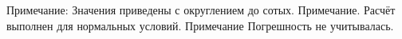 Примечание: Значения приведены с округлением до сотых. %
Примечание. Расчёт выполнен для нормальных условий. %
Примечание Погрешность не учитывалась. %
